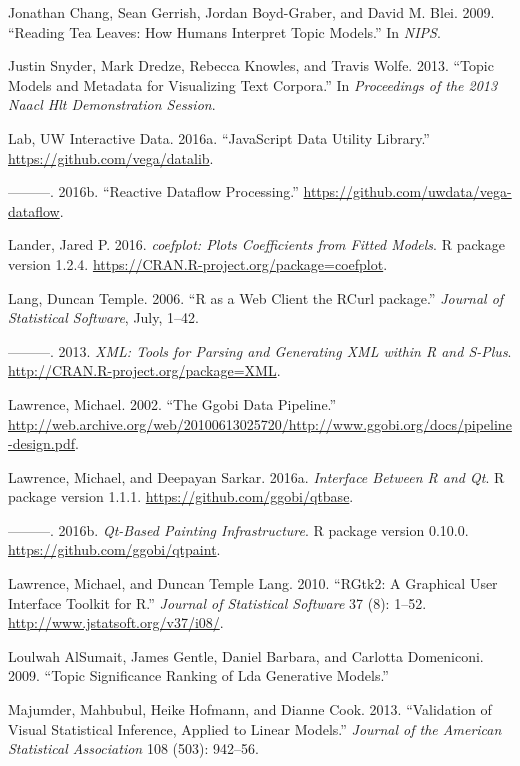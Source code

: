 \documentclass[12pt,]{isuthesis}
\begin{document}
\hypertarget{ref-Chang}{}
Jonathan Chang, Sean Gerrish, Jordan Boyd-Graber, and David M. Blei.
2009. ``Reading Tea Leaves: How Humans Interpret Topic Models.'' In
\emph{NIPS}.

\hypertarget{ref-Snyder}{}
Justin Snyder, Mark Dredze, Rebecca Knowles, and Travis Wolfe. 2013.
``Topic Models and Metadata for Visualizing Text Corpora.'' In
\emph{Proceedings of the 2013 Naacl Hlt Demonstration Session}.

\hypertarget{ref-datalib}{}
Lab, UW Interactive Data. 2016a. ``JavaScript Data Utility Library.''
\url{https://github.com/vega/datalib}.

\hypertarget{ref-vega-dataflow}{}
---------. 2016b. ``Reactive Dataflow Processing.''
\url{https://github.com/uwdata/vega-dataflow}.

\hypertarget{ref-coefplot}{}
Lander, Jared P. 2016. \emph{coefplot: Plots Coefficients from Fitted
Models}. R package version 1.2.4.
\url{https://CRAN.R-project.org/package=coefplot}.

\hypertarget{ref-Lang:2006us}{}
Lang, Duncan Temple. 2006. ``R as a Web Client the RCurl package.''
\emph{Journal of Statistical Software}, July, 1--42.

\hypertarget{ref-XML}{}
---------. 2013. \emph{XML: Tools for Parsing and Generating XML within
R and S-Plus}. \url{http://CRAN.R-project.org/package=XML}.

\hypertarget{ref-ggobi-pipeline-design}{}
Lawrence, Michael. 2002. ``The Ggobi Data Pipeline.''
\url{http://web.archive.org/web/20100613025720/http://www.ggobi.org/docs/pipeline-design.pdf}.

\hypertarget{ref-qtbase}{}
Lawrence, Michael, and Deepayan Sarkar. 2016a. \emph{Interface Between R
and Qt}. R package version 1.1.1. \url{https://github.com/ggobi/qtbase}.

\hypertarget{ref-qtpaint}{}
---------. 2016b. \emph{Qt-Based Painting Infrastructure}. R package
version 0.10.0. \url{https://github.com/ggobi/qtpaint}.

\hypertarget{ref-RGtk2}{}
Lawrence, Michael, and Duncan Temple Lang. 2010. ``RGtk2: A Graphical
User Interface Toolkit for R.'' \emph{Journal of Statistical Software}
37 (8): 1--52. \url{http://www.jstatsoft.org/v37/i08/}.

\hypertarget{ref-AlSumait}{}
Loulwah AlSumait, James Gentle, Daniel Barbara, and Carlotta Domeniconi.
2009. ``Topic Significance Ranking of Lda Generative Models.''

\hypertarget{ref-Majumder:2013ie}{}
Majumder, Mahbubul, Heike Hofmann, and Dianne Cook. 2013. ``Validation
of Visual Statistical Inference, Applied to Linear Models.''
\emph{Journal of the American Statistical Association} 108 (503):
942--56.
\end{document}
